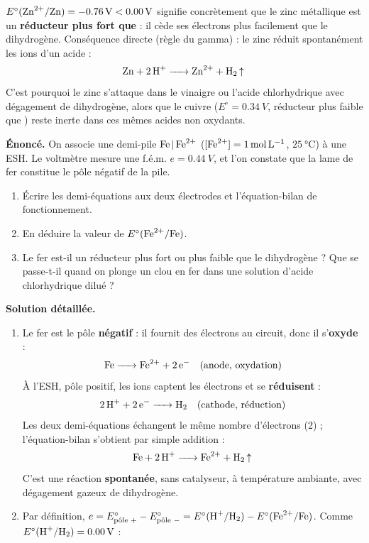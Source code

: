 \documentclass[11pt]{article}
\begin{document}
\begin{exemplebox}
$E^\circ(\ce{Zn^2+}/\ce{Zn}) = \SI{-0,76}{V} < \SI{0,00}{V}$ signifie concrètement que le zinc métallique est un \textbf{réducteur plus fort que } : il cède ses électrons plus facilement que le dihydrogène. Conséquence directe (règle du gamma) : le zinc réduit spontanément les ions  d'un acide :
\[ \ce{Zn + 2H+ -> Zn^2+ + H2 ^} \]
C'est pourquoi le zinc s'attaque dans le vinaigre ou l'acide chlorhydrique avec dégagement de dihydrogène, alors que le cuivre ($E^\circ = \SI{+0,34}{V}$, réducteur plus faible que ) reste inerte dans ces mêmes acides non oxydants.
\end{exemplebox}

\begin{exoresolu}
\textbf{Énoncé.} On associe une demi-pile $\ce{Fe | Fe^2+}$ ($[\ce{Fe^2+}] = \SI{1}{mol.L^{-1}}$, $\SI{25}{\celsius}$) à une ESH. Le voltmètre mesure une f.é.m. $e = \SI{0,44}{V}$, et l'on constate que la lame de fer constitue le pôle négatif de la pile.
\begin{enumerate}
\item Écrire les demi-équations aux deux électrodes et l'équation-bilan de fonctionnement.
\item En déduire la valeur de $E^\circ(\ce{Fe^2+}/\ce{Fe})$.
\item Le fer est-il un réducteur plus fort ou plus faible que le dihydrogène ? Que se passe-t-il quand on plonge un clou en fer dans une solution d'acide chlorhydrique dilué ?
\end{enumerate}
\tcblower
\textbf{Solution détaillée.}
\begin{enumerate}
\item Le fer est le pôle \textbf{négatif} : il fournit des électrons au circuit, donc il s'\textbf{oxyde} :
\[ \ce{Fe -> Fe^2+ + 2e-} \quad \text{(anode, oxydation)} \]
À l'ESH, pôle positif, les ions  captent les électrons et se \textbf{réduisent} :
\[ \ce{2H+ + 2e- -> H2} \quad \text{(cathode, réduction)} \]
Les deux demi-équations échangent le même nombre d'électrons (2) ; l'équation-bilan s'obtient par simple addition :
\[ \ce{Fe + 2H+ -> Fe^2+ + H2 ^} \]
C'est une réaction \textbf{spontanée}, sans catalyseur, à température ambiante, avec dégagement gazeux de dihydrogène.
\item Par définition, $e = E^\circ_{\text{pôle }+} - E^\circ_{\text{pôle }-} = E^\circ(\ce{H+}/\ce{H2}) - E^\circ(\ce{Fe^2+}/\ce{Fe})$. Comme $E^\circ(\ce{H+}/\ce{H2}) = \SI{0,00}{V}$ :

\end{enumerate}
\end{exoresolu}
\end{document}
